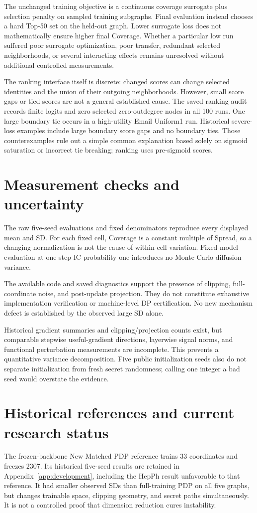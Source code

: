 The unchanged training objective is a continuous coverage surrogate plus selection penalty on sampled training subgraphs. Final evaluation instead chooses a hard Top-50 set on the held-out graph. Lower surrogate loss does not mathematically ensure higher final Coverage. Whether a particular low run suffered poor surrogate optimization, poor transfer, redundant selected neighborhoods, or several interacting effects remains unresolved without additional controlled measurements.

The ranking interface itself is discrete: changed scores can change selected identities and the union of their outgoing neighborhoods. However, small score gaps or tied scores are not a general established cause. The saved ranking audit records finite logits and zero selected zero-outdegree nodes in all 100 runs. One large boundary tie occurs in a high-utility Email Uniform1 run. Historical severe-loss examples include large boundary score gaps and no boundary ties. Those counterexamples rule out a simple common explanation based solely on sigmoid saturation or incorrect tie breaking; ranking uses pre-sigmoid scores.

\section{Measurement checks and uncertainty}
The raw five-seed evaluations and fixed denominators reproduce every displayed mean and SD. For each fixed cell, Coverage is a constant multiple of Spread, so a changing normalization is not the cause of within-cell variation. Fixed-model evaluation at one-step IC probability one introduces no Monte Carlo diffusion variance.

The available code and saved diagnostics support the presence of clipping, full-coordinate noise, and post-update projection. They do not constitute exhaustive implementation verification or machine-level DP certification. No new mechanism defect is established by the observed large SD alone.

Historical gradient summaries and clipping/projection counts exist, but comparable stepwise useful-gradient directions, layerwise signal norms, and functional perturbation measurements are incomplete. This prevents a quantitative variance decomposition. Five public initialization seeds also do not separate initialization from fresh secret randomness; calling one integer a bad seed would overstate the evidence.

\section{Historical references and current research status}
The frozen-backbone New Matched PDP reference trains 33 coordinates and freezes 2307. Its historical five-seed results are retained in Appendix~\ref{app:development}, including the HepPh result unfavorable to that reference. It had smaller observed SDs than full-training PDP on all five graphs, but changes trainable space, clipping geometry, and secret paths simultaneously. It is not a controlled proof that dimension reduction cures instability.

